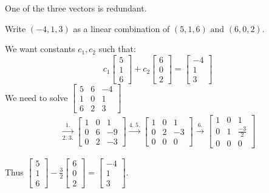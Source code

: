 \documentclass[../main.tex]{subfiles}
\begin{document}
\begin{note}
    One of the three vectors is redundant.
\end{note}

\begin{example}[]
    Write \( (-4,1,3) \) as a linear combination of \( (5,1,6) \text{ and } (6,0,2) \).

    We want constants \( c_1,c_2 \) such that:
    \[ c_1 \begin{bmatrix} 5 \\ 1 \\ 6 \end{bmatrix} + c_2 \begin{bmatrix} 6 \\ 0 \\ 2 \end{bmatrix}
    = \begin{bmatrix} -4 \\ 1 \\ 3 \end{bmatrix} \]
    We need to solve \( \begin{bmatrix}
        5 & 6 & -4 \\
        1 & 0 & 1 \\
        6 & 2 & 3
    \end{bmatrix} \)
    \begin{gather*}
        \xrightarrow[2. \; 3.]{1.}
        \begin{bmatrix}
            1 & 0 & 1 \\
            0 & 6 & -9 \\
            0 & 2 & -3
        \end{bmatrix}
        \xrightarrow[]{4. \; 5.}
        \begin{bmatrix}
            1 & 0 & 1 \\
            0 & 2 & -3 \\
            0 & 0 & 0
        \end{bmatrix}
        \xrightarrow[]{6.}
        \begin{bmatrix}
            1 & 0 & 1 \\
            0 & 1 & \frac{-3}{2} \\
            0 & 0 & 0
        \end{bmatrix}
    \end{gather*}

    Thus \( \begin{bmatrix} 5 \\ 1 \\ 6 \end{bmatrix} -\displaystyle \frac{3}{2} \begin{bmatrix} 6 \\ 0 \\ 2 \end{bmatrix}
    = \begin{bmatrix} -4 \\ 1 \\ 3 \end{bmatrix} \).
\end{example}
\end{document}

